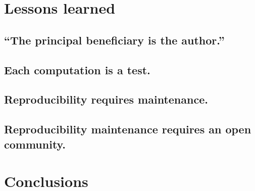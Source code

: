 \section{Lessons learned}

\subsection{``The principal beneficiary is the author.''}

\subsection{Each computation is a test.}

\subsection{Reproducibility requires maintenance.}

\subsection{Reproducibility maintenance requires an open community.}

\section{Conclusions}

